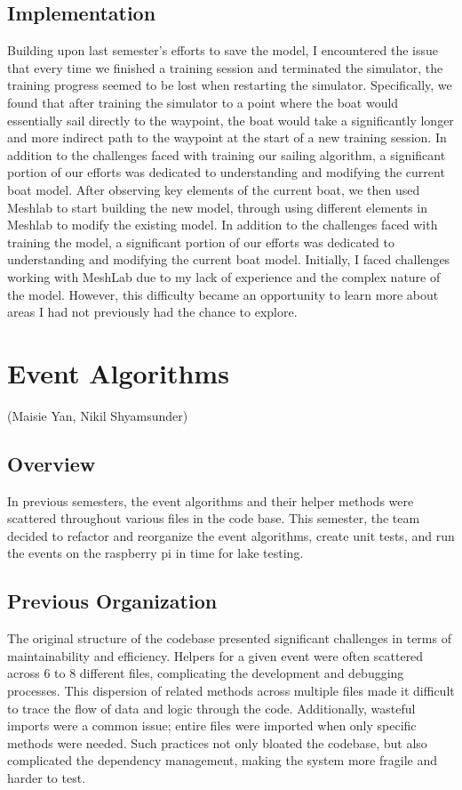 \documentclass{article}
\begin{document}
\subsection{Implementation}
Building upon last semester's efforts to save the model, I encountered the issue that every time we finished a training session and terminated the simulator, the training progress seemed to be lost when restarting the simulator. Specifically, we found that after training the simulator to a point where the boat would essentially sail directly to the waypoint, the boat would take a significantly longer and more indirect path to the waypoint at the start of a new training session.
\indent In addition to the challenges faced with training our sailing algorithm, a significant portion of our efforts was dedicated to understanding and modifying the current boat model. After observing key elements of the current boat, we then used Meshlab to start building the new model, through using different elements in Meshlab to modify the existing model. In addition to the challenges faced with training the model, a significant portion of our efforts was dedicated to understanding and modifying the current boat model. Initially, I faced challenges working with MeshLab due to my lack of experience and the complex nature of the model. However, this difficulty became an opportunity to learn more about areas I had not previously had the chance to explore. 

\section{Event Algorithms}
(Maisie Yan, Nikil Shyamsunder)
\newline
\subsection{Overview}
In previous semesters, the event algorithms and their helper methods were scattered throughout various files in the code base. This semester, the team decided to refactor and reorganize the event algorithms, create unit tests, and run the events on the raspberry pi in time for lake testing.  

\subsection{Previous Organization}
The original structure of the codebase presented significant challenges in terms of maintainability and efficiency. Helpers for a given event were often scattered across 6 to 8 different files, complicating the development and debugging processes. This dispersion of related methods across multiple files made it difficult to trace the flow of data and logic through the code. Additionally, wasteful imports were a common issue; entire files were imported when only specific methods were needed. Such practices not only bloated the codebase, but also complicated the dependency management, making the system more fragile and harder to test.
\end{document}
